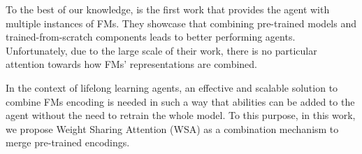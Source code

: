 To the best of our knowledge, \citet{sima2024} is the first work that provides the agent with multiple instances of FMs.
They showcase that combining pre-trained models and trained-from-scratch components leads to better performing agents.
Unfortunately, due to the large scale of their work, there is no particular attention towards how FMs' representations are combined.

In the context of lifelong learning agents, an effective and scalable solution to combine FMs encoding is needed in such a way that abilities can be added to the agent without the need to retrain the whole model.
To this purpose, in this work, we propose Weight Sharing Attention (WSA) as a combination mechanism to merge pre-trained encodings.
